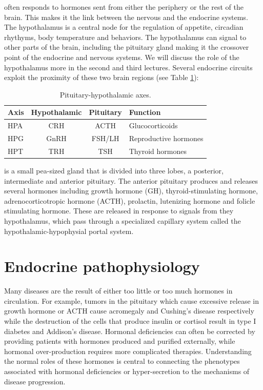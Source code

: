 \documentclass{tufte-handout}
\begin{document}
 often responds to hormones sent from either the periphery or the rest of the brain.  This makes it the link between the nervous and the endocrine systems.  The hypothalamus is a central node for the regulation of appetite, circadian rhythyms, body temperature and behaviors.  The hypothalamus can signal to other parts of the brain, including the pituitary gland making it the crossover point of the endocrine and nervous systems.  We will discuss the role of the hypothalamus more in the second and third lectures.  Several endocrine circuits exploit the proximity of these two brain regions (see Table \ref{tab:pituitary-axes}):

\begin{table}
  \centering
  \begin{tabular}{lccl}
    \toprule
    Axis & Hypothalamic & Pituitary & Function \\
    \midrule
    HPA & CRH & ACTH & Glucocorticoids \\
    HPG & GnRH & FSH/LH & Reproductive hormones \\
    HPT & TRH & TSH & Thyroid hormones \\
    \bottomrule
  \end{tabular}
  \caption{Pituitary-hypothalamic axes.}
  \label{tab:pituitary-axes}
\end{table}

 is a small pea-sized gland that is divided into three lobes, a posterior, intermediate and anterior pituitary.  The anterior pituitary produces and releases several hormones including growth hormone (GH), thyroid-stimulating hormone, adrenocorticotropic hormone (ACTH), prolactin, lutenizing hormone and folicle stimulating hormone.  These are released in response to signals from they hypothalamus, which pass through a specialized capillary system called the hypothalamic-hypophysial portal system.    

\section{Endocrine pathophysiology}

Many diseases are the result of either too little or too much hormones in circulation.  For example, tumors in the pituitary which cause excessive release in growth hormone or ACTH cause acromegaly\cite{Marie1907} and Cushing's disease\cite{Cushing1932} respectively while the destruction of the cells that produce insulin or cortisol result in type I diabetes\cite{Banting1922b} and Addison's disease\cite{Addison1855}.  Hormonal deficiencies can often be corrected by providing patients with hormones produced and purified externally, while hormonal over-production requires  more complicated therapies.  Understanding the normal roles of these hormones is central to connecting the phenotypes associated with hormonal deficiencies or hyper-secretion to the mechanisms of disease progression.

\listoffigures
\listoftables



\end{document}
